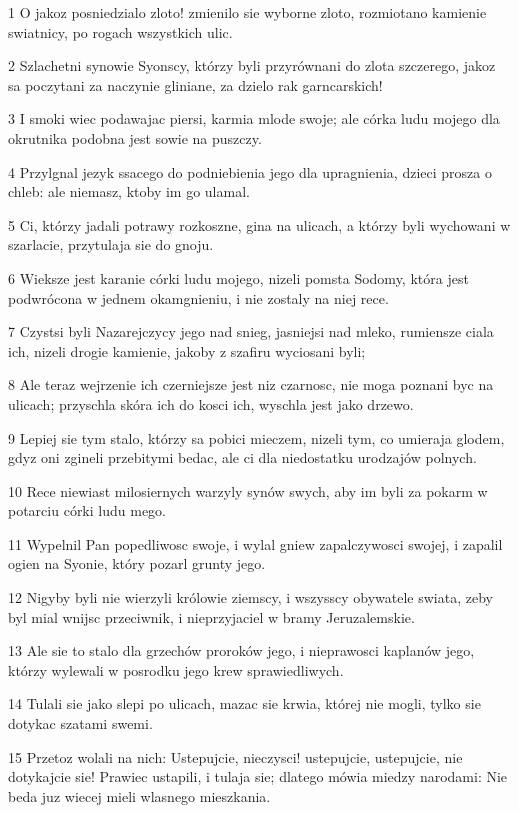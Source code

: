 \par 1 O jakoz posniedzialo zloto! zmienilo sie wyborne zloto, rozmiotano kamienie swiatnicy, po rogach wszystkich ulic.
\par 2 Szlachetni synowie Syonscy, którzy byli przyrównani do zlota szczerego, jakoz sa poczytani za naczynie gliniane, za dzielo rak garncarskich!
\par 3 I smoki wiec podawajac piersi, karmia mlode swoje; ale córka ludu mojego dla okrutnika podobna jest sowie na puszczy.
\par 4 Przylgnal jezyk ssacego do podniebienia jego dla upragnienia, dzieci prosza o chleb: ale niemasz, ktoby im go ulamal.
\par 5 Ci, którzy jadali potrawy rozkoszne, gina na ulicach, a którzy byli wychowani w szarlacie, przytulaja sie do gnoju.
\par 6 Wieksze jest karanie córki ludu mojego, nizeli pomsta Sodomy, która jest podwrócona w jednem okamgnieniu, i nie zostaly na niej rece.
\par 7 Czystsi byli Nazarejczycy jego nad snieg, jasniejsi nad mleko, rumiensze ciala ich, nizeli drogie kamienie, jakoby z szafiru wyciosani byli;
\par 8 Ale teraz wejrzenie ich czerniejsze jest niz czarnosc, nie moga poznani byc na ulicach; przyschla skóra ich do kosci ich, wyschla jest jako drzewo.
\par 9 Lepiej sie tym stalo, którzy sa pobici mieczem, nizeli tym, co umieraja glodem, gdyz oni zgineli przebitymi bedac, ale ci dla niedostatku urodzajów polnych.
\par 10 Rece niewiast milosiernych warzyly synów swych, aby im byli za pokarm w potarciu córki ludu mego.
\par 11 Wypelnil Pan popedliwosc swoje, i wylal gniew zapalczywosci swojej, i zapalil ogien na Syonie, który pozarl grunty jego.
\par 12 Nigyby byli nie wierzyli królowie ziemscy, i wszysscy obywatele swiata, zeby byl mial wnijsc przeciwnik, i nieprzyjaciel w bramy Jeruzalemskie.
\par 13 Ale sie to stalo dla grzechów proroków jego, i nieprawosci kaplanów jego, którzy wylewali w posrodku jego krew sprawiedliwych.
\par 14 Tulali sie jako slepi po ulicach, mazac sie krwia, której nie mogli, tylko sie dotykac szatami swemi.
\par 15 Przetoz wolali na nich: Ustepujcie, nieczysci! ustepujcie, ustepujcie, nie dotykajcie sie! Prawiec ustapili, i tulaja sie; dlatego mówia miedzy narodami: Nie beda juz wiecej mieli wlasnego mieszkania.
